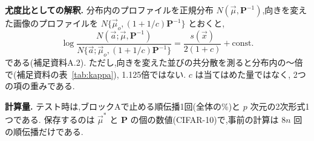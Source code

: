 \documentclass[MIRU,submit]{miru2025j}
\newcommand{\Pm}{\mathbf{P}}\newcommand{\Gm}{\mathbf{G}}\newcommand{\vd}{\vec{\delta}}\newcommand{\vmu}{\vec{\mu}}\newcommand{\va}{\vec{a}}\newcommand{\Sm}{\mathbf{S}}\newcommand{\Id}{\mathbf{I}}
\begin{document}
\textbf{尤度比としての解釈.} 分布内のプロファイルを正規分布 $N(\vmu,\Pm^{-1})$,向きを変えた画像のプロファイルを $N\{\vmu_{o},(1+1/c)\Pm^{-1}\}$ とおくと,
\begin{equation}
\log\frac{N(\va;\vmu,\Pm^{-1})}{N\{\va;\vmu_{o},(1+1/c)\Pm^{-1}\}}=\frac{s(\vec{x})}{2(1+c)}+\mathrm{const.}
\label{eq:llr}
\end{equation}
である(補足資料A.2). ただし,向きを変えた並びの共分散を測ると分布内の\olKapMin{}〜\olKapMax{}倍で(補足資料の表~\ref{tab:kappa}), 1.125倍ではない. $c$ は当てはめた量ではなく, 2つの項の重みである.

\textbf{計算量.} テスト時は,ブロックAで止める順伝播1回(全体の\olFwdAShare\%)と $p$ 次元の2次形式1つである. 保存するのは $\vmu^{*}$ と $\Pm$ の\olNStored{}個の数値(CIFAR-10)で,事前の計算は $8n$ 回の順伝播だけである.
\end{document}
